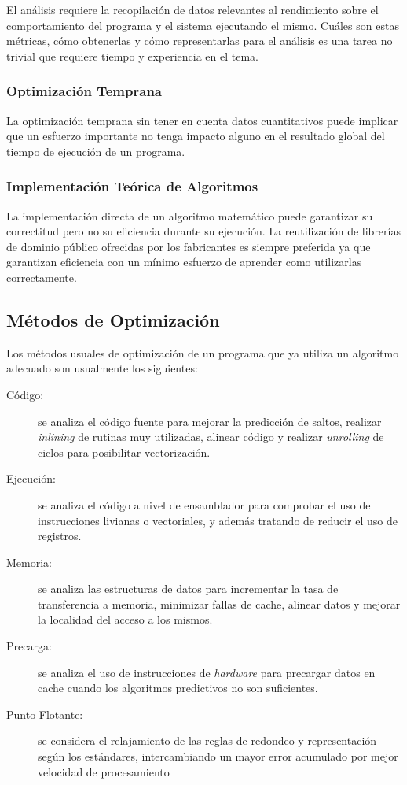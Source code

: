 \documentclass[a4paper]{report}
\begin{document}
El análisis requiere la recopilación de datos relevantes al rendimiento sobre el comportamiento del programa y el sistema ejecutando el mismo. Cuáles son estas métricas, cómo obtenerlas y cómo representarlas para el análisis es una tarea no trivial que requiere tiempo y experiencia en el tema.

\subsubsection{Optimización Temprana}

La optimización temprana sin tener en cuenta datos cuantitativos puede implicar que un esfuerzo importante no tenga impacto alguno en el resultado global del tiempo de ejecución de un programa.

\subsubsection{Implementación Teórica de Algoritmos}

La implementación directa de un algoritmo matemático puede garantizar su correctitud pero no su eficiencia durante su ejecución. La reutilización de librerías de dominio público ofrecidas por
los fabricantes es siempre preferida ya que garantizan eficiencia con un mínimo esfuerzo de aprender como utilizarlas correctamente.

\subsection{Métodos de Optimización}

Los métodos usuales de optimización de un programa que ya utiliza un algoritmo adecuado son usualmente los siguientes:

\begin{description}
\item[Código:] se analiza el código fuente para mejorar la predicción de saltos, realizar {\it inlining} de rutinas muy utilizadas, alinear código y realizar {\it unrolling} de ciclos para posibilitar vectorización.
\item[Ejecución:] se analiza el código a nivel de ensamblador para comprobar el uso de instrucciones livianas o vectoriales, y además tratando de reducir el uso de registros.
\item[Memoria:] se analiza las estructuras de datos para incrementar la tasa de transferencia a memoria, minimizar fallas de cache, alinear datos y mejorar la localidad del acceso a los mismos.
\item[Precarga:] se analiza el uso de instrucciones de {\it hardware} para precargar datos en cache cuando los algoritmos predictivos no son suficientes.
\item[Punto Flotante:] se considera el relajamiento de las reglas de redondeo y representación según los estándares, intercambiando un mayor error acumulado por mejor velocidad de procesamiento
\end{description}
\end{document}
